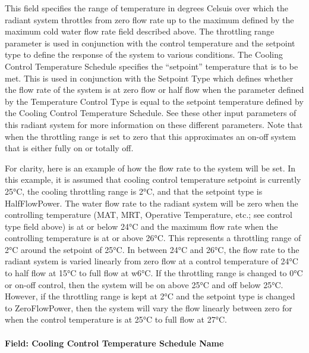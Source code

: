 This field specifies the range of temperature in degrees Celsuis over which the radiant system throttles from zero flow rate up to the maximum defined by the maximum cold water flow rate field described above. The throttling range parameter is used in conjunction with the control temperature and the setpoint type to define the response of the system to various conditions. The Cooling Control Temperature Schedule specifies the ``setpoint'' temperature that is to be met.  This is used in conjunction with the Setpoint Type which defines whether the flow rate of the system is at zero flow or half flow when the parameter defined by the Temperature Control Type is equal to the setpoint temperature defined by the Cooling Control Temperature Schedule.  See these other input parameters of this radiant system for more information on these different parameters.  Note that when the throttling range is set to zero that this approximates an on-off system that is either fully on or totally off.

For clarity, here is an example of how the flow rate to the system will be set.  In this example, it is assumed that cooling control temperature setpoint is currently 25°C, the cooling throttling range is 2°C, and that the setpoint type is HalfFlowPower.  The water flow rate to the radiant system will be zero when the controlling temperature (MAT, MRT, Operative Temperature, etc.; see control type field above) is at or below 24°C and the maximum flow rate when the controlling temperature is at or above 26°C. This represents a throttling range of 2°C around the setpoint of 25°C. In between 24°C and 26°C, the flow rate to the radiant system is varied linearly from zero flow at a control temperature of 24°C to half flow at 15°C to full flow at w6°C.  If the throttling range is changed to 0°C or on-off control, then the system will be on above 25°C and off below 25°C.  However, if the throttling range is kept at 2°C and the setpoint type is changed to ZeroFlowPower, then the system will vary the flow linearly between zero for when the control temperature is at 25°C to full flow at 27°C.

\paragraph{Field: Cooling Control Temperature Schedule Name}\label{field-cooling-control-temperature-schedule-name}

